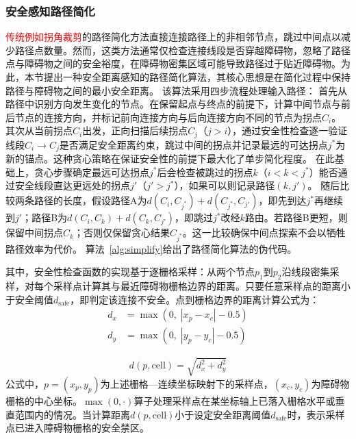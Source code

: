 \documentclass[lettersize,journal]{IEEEtran}
\begin{document}
\subsubsection{安全感知路径简化}
\textcolor{red}{传统例如拐角裁剪}的路径简化方法直接连接路径上的非相邻节点，跳过中间点以减少路径点数量。然而，这类方法通常仅检查连接线段是否穿越障碍物，忽略了路径点与障碍物之间的安全裕度，在障碍物密集区域可能导致路径过于贴近障碍物。为此，本节提出一种安全距离感知的路径简化算法，其核心思想是在简化过程中保持路径与障碍物之间的最小安全距离。
该算法采用四步流程处理输入路径：
首先从路径中识别方向发生变化的节点。在保留起点与终点的前提下，计算中间节点与前后节点的连接方向，并标记前向连接方向与后向连接方向不同的节点为拐点$C_i$。
其次从当前拐点$C_i$出发，正向扫描后续拐点$C_j$（$j > i$），通过安全性检查逐一验证线段$C_i \to C_j$是否满足安全距离约束，跳过中间的拐点并记录最远的可达拐点$j^{*}$为新的锚点。这种贪心策略在保证安全性的前提下最大化了单步简化程度。
在此基础上，贪心步骤确定最远可达拐点$j^{*}$后会检查被跳过的拐点$k$（$i < k < j^{*}$）能否通过安全线段直达更远处的拐点$j'$（$j' > j^{*}$），如果可以则记录路径$(k, j')$。
随后比较两条路径的长度，假设路径A为$d(C_i, C_{j^{*}}) + d(C_{j^{*}}, C_{j'})$，即先到达$j^{*}$再继续到$j'$；路径B为$d(C_i, C_k) + d(C_k, C_{j'})$，即跳过$j^{*}$改经$k$路由。若路径B更短，则保留中间拐点$C_k$；否则仅保留贪心结果$C_{j^{*}}$。这一比较确保中间点探索不会以牺牲路径效率为代价。
算法~\textcolor{blue}{\ref{alg:simplify}}给出了路径简化算法的伪代码。

其中，安全性检查函数的实现基于逐栅格采样：从两个节点$p_1$到$p_2$沿线段密集采样，对每个采样点计算其与最近障碍物栅格边界的距离。只要任意采样点的距离小于安全阈值$d_{\mathrm{safe}}$，即判定该连接不安全。点到栅格边界的距离计算公式为：
\begin{equation}
\begin{split}
d_x &= \max\left(0,\; |x_p - x_c| - 0.5\right)\\
d_y &= \max\left(0,\; |y_p - y_c| - 0.5\right)
\end{split}
\label{eq:dxymax}
\end{equation}

\begin{equation}
d(p, \mathrm{cell}) = \sqrt{d_x^2 + d_y^2}
\label{eq:dist}
\end{equation}
公式中，$p = (x_p, y_p)$为上述栅格—连续坐标映射下的采样点，$(x_c, y_c)$为障碍物栅格的中心坐标。$\max(0, \cdot)$算子处理采样点在某坐标轴上已落入栅格水平或垂直范围内的情况。当计算距离$d(p, \mathrm{cell})$小于设定安全距离阈值$d_{\mathrm{safe}}$时，表示采样点已进入障碍物栅格的安全禁区。
\end{document}
